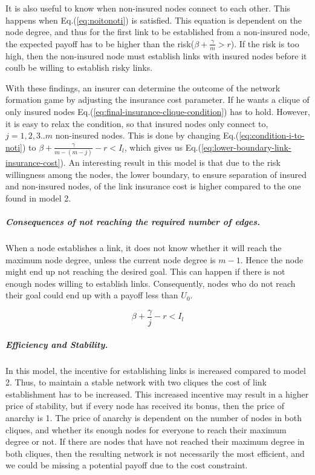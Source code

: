 It is also useful to know when non-insured nodes connect to each other. This happens when Eq.(\ref{eq:noitonoti}) is satisfied. This equation is dependent on the node degree, and thus for the first link to be established from a non-insured node, the expected payoff has to be higher than the risk($\beta+\frac{\gamma}{m}>r$). If the risk is too high, then the non-insured node must establish links with insured nodes before it coulb be willing to establish risky links.

With these findings, an insurer can determine the outcome of the network formation game by adjusting the insurance cost parameter.
If he wants a clique of only insured nodes Eq.(\ref{eq:final-insurance-clique-condition}) has to
hold. However, it is easy to relax the condition, so that insured nodes only connect to, $j=1,2,3..m$ non-insured nodes.
   This is done by changing Eq.(\ref{eq:condition-i-to-noti}) to $\beta+\frac{\gamma}{m-(m-j)}-r<I_{l}$, which
    gives us Eq.(\ref{eq:lower-boundary-link-insurance-cost}).
An interesting result in this model is that due to the risk willingness among the nodes, the lower boundary, to ensure separation of insured and non-insured nodes, of the link insurance cost is higher compared to the one found in model 2. 

\subparagraph{Consequences of not reaching the required number of edges.} When a node establishes a link, it does not know whether it will reach the maximum node degree, unless the current node degree is $m-1$. Hence the node might end up not reaching the desired goal. This can happen if there is not enough nodes willing to establish links. Consequently, nodes who do not reach their goal could end up with a payoff less than $U_{0}$. 

\begin{equation} 
\beta+\frac{\gamma}{j}-r<I_{l}
\label{eq:lower-boundary-link-insurance-cost}
\end{equation} 



\subparagraph{Efficiency and Stability.}

In this model, the incentive for establishing links is increased compared to model 2. Thus, to maintain a stable network with two cliques the cost of link establishment has to be increased. This increased incentive may result in a higher price of stability, but if every node has received its bonus, then the price of anarchy is 1. The price of anarchy is dependent on the number of nodes in both cliques, and whether its enough nodes for everyone to reach their maximum degree or not. 
If there are nodes that have not reached their maximum degree in both cliques, then the resulting network is not necessarily the most efficient, and we could be missing a potential payoff due to the cost constraint. 

